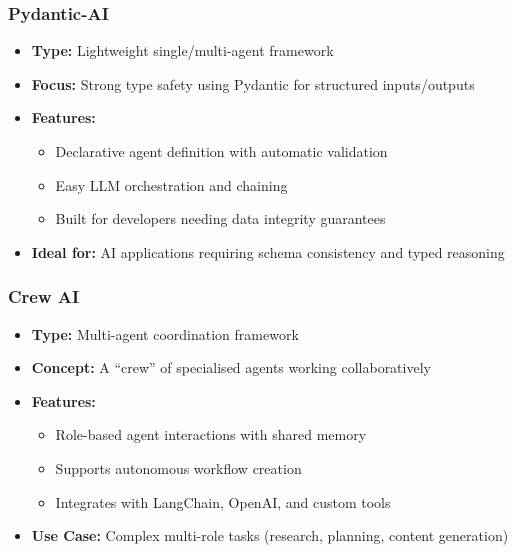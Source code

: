 \begin{frame}[fragile]\frametitle{Pydantic-AI}
    \begin{itemize}
        \item \textbf{Type:} Lightweight single/multi-agent framework
        \item \textbf{Focus:} Strong type safety using Pydantic for structured inputs/outputs
        \item \textbf{Features:}
              \begin{itemize}
                  \item Declarative agent definition with automatic validation
                  \item Easy LLM orchestration and chaining
                  \item Built for developers needing data integrity guarantees
              \end{itemize}
        \item \textbf{Ideal for:} AI applications requiring schema consistency and typed reasoning
    \end{itemize}
\end{frame}

\begin{frame}[fragile]\frametitle{Crew AI}
    \begin{itemize}
        \item \textbf{Type:} Multi-agent coordination framework
        \item \textbf{Concept:} A ``crew'' of specialised agents working collaboratively
        \item \textbf{Features:}
              \begin{itemize}
                  \item Role-based agent interactions with shared memory
                  \item Supports autonomous workflow creation
                  \item Integrates with LangChain, OpenAI, and custom tools
              \end{itemize}
        \item \textbf{Use Case:} Complex multi-role tasks (research, planning, content generation)
    \end{itemize}
\end{frame}

